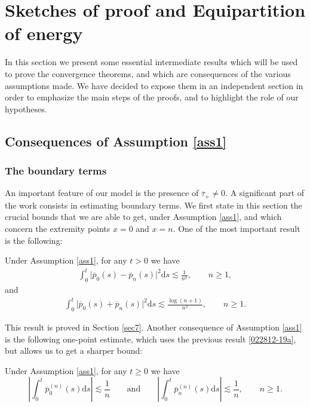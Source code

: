 \documentclass[EJP]{ejpecp} %
\renewcommand{\ge}{\geqslant}
\newcommand{\dd  }{\mathrm{d}}
\renewcommand{\bar}{\overline}
\numberwithin{equation}{section}
\begin{document}
\section{Sketches of proof and Equipartition of energy}

In this section we present some essential intermediate results which
will be used to prove the convergence theorems, and which are
consequences of the various assumptions made. We have decided to expose them in an independent section in order to emphasize the main steps of the proofs, and to highlight the role of our hypotheses.  


\label{sec:equipartition}

\subsection{Consequences of Assumption \ref{ass1}}

\subsubsection{The boundary terms}
An important feature of our model is the presence of $\bar \tau_+ \neq 0$. A significant part of the work consists in estimating boundary terms. We first state in this section the crucial bounds that we are able to get, under Assumption \ref{ass1}, and which concern the extremity points $x=0$ and $x=n$. One of the most important result is the following:
\begin{proposition}
\label{prop012812-19}
Under Assumption \ref{ass1}, for any $t>0$ we have
\begin{align}
\label{022812-19a}
\int_0^t\big|\bar p_{0}(s)-\bar p_{n}(s)\big|^2\dd s \lesssim \frac{1}{n^2},\qquad n\ge1,
\end{align}
and
\begin{align}
\label{022812-19b}
\int_0^t\big|\bar p_{0}(s)+\bar p_{n}(s)\big|^2\dd s \lesssim  \frac{\log
  (n+1)}{n^2},\qquad n\ge1.
\end{align}
\end{proposition}

This  result is proved in Section  \ref{sec7}.  
Another consequence of Assumption \ref{ass1} is the following one-point estimate, which uses the previous result \eqref{022812-19a}, but allows us to get a sharper bound:  



\begin{proposition}
\label{lm010911-19a} 
Under Assumption \ref{ass1}, 
for any $t\ge0$ we have
\begin{equation}
\label{052412-19a}
\left|\int_0^t\bar p_{0}^{(n)}(s)\dd s\right|\lesssim \frac{1}{n} \qquad \text{and} \qquad \left|\int_0^t\bar p_{n}^{(n)}(s)\dd s\right|\lesssim \frac{1}{n},\qquad
 n\ge1.
\end{equation}
\end{proposition}
\end{document}
